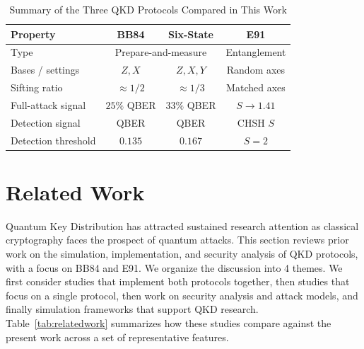 \documentclass[conference]{IEEEtran}
\begin{document}
\begin{table}[!ht]
\caption{Summary of the Three QKD Protocols Compared in This Work}
\label{tab:protocols}
\begin{center}
\setlength{\tabcolsep}{4pt}
\renewcommand{\arraystretch}{1.4}
\footnotesize
\begin{tabular}{|l|c|c|c|}
\hline
\textbf{Property} & \textbf{BB84} & \textbf{Six-State} & \textbf{E91} \\ \hline
Type & \multicolumn{2}{c|}{Prepare-and-measure} & Entanglement \\ \hline
Bases / settings & $Z, X$ & $Z, X, Y$ & Random axes \\ \hline
Sifting ratio & $\approx 1/2$ & $\approx 1/3$ & Matched axes \\ \hline
Full-attack signal & $25\%$ QBER & $33\%$ QBER & $S \to 1.41$ \\ \hline
Detection signal & QBER & QBER & CHSH $S$ \\ \hline
Detection threshold & $0.135$ & $0.167$ & $S = 2$ \\ \hline
\end{tabular}
\end{center}
\end{table}

\section{Related Work}
Quantum Key Distribution has attracted sustained research attention as
classical cryptography faces the prospect of quantum attacks. This section
reviews prior work on the simulation, implementation, and security analysis of
QKD protocols, with a focus on BB84 and E91. We organize the discussion into
4 themes. We first consider studies that implement both protocols together,
then studies that focus on a single protocol, then work on security analysis
and attack models, and finally simulation frameworks that support QKD research.
Table~\ref{tab:relatedwork} summarizes how these studies compare against the
present work across a set of representative features.
\end{document}
